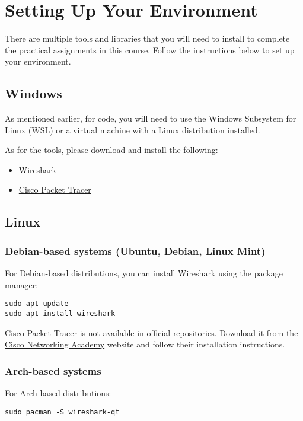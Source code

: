 \section{Setting Up Your Environment}

There are multiple tools and libraries that you will need to install to complete the practical assignments in this course. Follow the instructions below to set up your environment.

\subsection{Windows}
As mentioned earlier, for code, you will need to use the Windows Subsystem for Linux (WSL) or a virtual machine with a Linux distribution installed.

As for the tools, please download and install the following:
\begin{itemize}
    \item \href{https://www.wireshark.org/download.html}{Wireshark}
    \item \href{https://www.netacad.com/cisco-packet-tracer}{Cisco Packet Tracer}
\end{itemize}

\subsection{Linux}

\subsubsection{Debian-based systems (Ubuntu, Debian, Linux Mint)}\label{sec:debian-install}
For Debian-based distributions, you can install Wireshark using the package manager:
\begin{verbatim}
sudo apt update
sudo apt install wireshark
\end{verbatim}

\begin{noteblock}
Cisco Packet Tracer is not available in official repositories. Download it from the \href{https://www.netacad.com/courses/packet-tracer}{Cisco Networking Academy} website and follow their installation instructions.
\end{noteblock}

\subsubsection{Arch-based systems}
For Arch-based distributions:
\begin{verbatim}
sudo pacman -S wireshark-qt
\end{verbatim}


